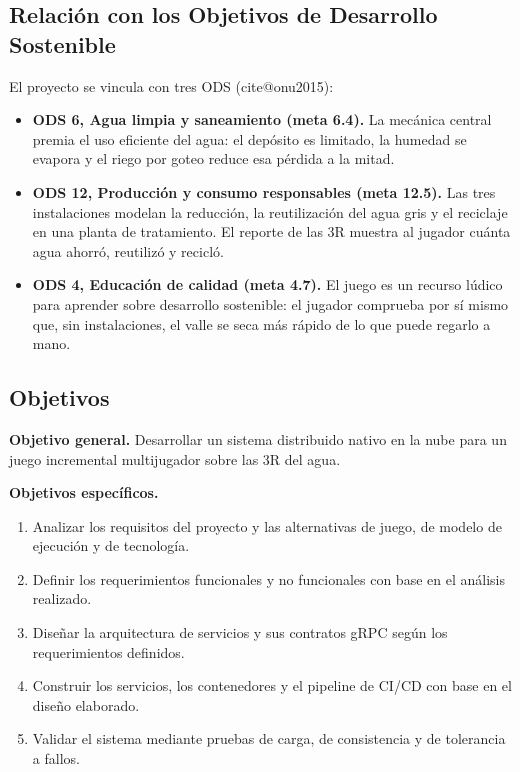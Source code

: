\documentclass[11pt,letterpaper]{article}
\makeatletter
\newcommand{\parencite}[1]{(\csname cite@#1\endcsname)}
\makeatother
\begin{document}
\subsection{Relación con los Objetivos de Desarrollo Sostenible}

El proyecto se vincula con tres ODS \parencite{onu2015}:
\begin{itemize}
\item \textbf{ODS 6, Agua limpia y saneamiento (meta 6.4).} La mecánica central premia el uso eficiente del agua: el depósito es limitado, la humedad se evapora y el riego por goteo reduce esa pérdida a la mitad.
\item \textbf{ODS 12, Producción y consumo responsables (meta 12.5).} Las tres instalaciones modelan la reducción, la reutilización del agua gris y el reciclaje en una planta de tratamiento. El reporte de las 3R muestra al jugador cuánta agua ahorró, reutilizó y recicló.
\item \textbf{ODS 4, Educación de calidad (meta 4.7).} El juego es un recurso lúdico para aprender sobre desarrollo sostenible: el jugador comprueba por sí mismo que, sin instalaciones, el valle se seca más rápido de lo que puede regarlo a mano.
\end{itemize}

\subsection{Objetivos}

\textbf{Objetivo general.} Desarrollar un sistema distribuido nativo en la nube para un juego incremental multijugador sobre las 3R del agua.

\textbf{Objetivos específicos.}
\begin{enumerate}
\item Analizar los requisitos del proyecto y las alternativas de juego, de modelo de ejecución y de tecnología.
\item Definir los requerimientos funcionales y no funcionales con base en el análisis realizado.
\item Diseñar la arquitectura de servicios y sus contratos gRPC según los requerimientos definidos.
\item Construir los servicios, los contenedores y el pipeline de CI/CD con base en el diseño elaborado.
\item Validar el sistema mediante pruebas de carga, de consistencia y de tolerancia a fallos.
\end{enumerate}
\end{document}
